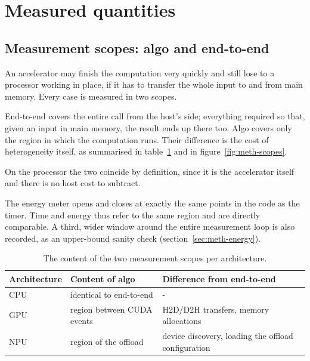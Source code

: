

\section{Measured quantities}
\label{sec:meth-quantities}

\subsection{Measurement scopes: algo and end-to-end}
\label{sec:meth-energy-scope}

An accelerator may finish the computation very quickly and still lose to a
processor working in place, if it has to transfer the whole input to and from
main memory. Every case is measured in two scopes.

End-to-end covers the entire call from the host's side; everything required so
that, given an input in main memory, the result ends up there too. Algo covers
only the region in which the computation runs. Their difference is the cost of
heterogeneity itself, as summarised in table~\ref{tab:scopes} and in
figure~\ref{fig:meth-scopes}.

On the processor the two coincide by definition, since it is the accelerator
itself and there is no host cost to subtract.

The energy meter opens and closes at exactly the same points in the code as the
timer. Time and energy thus refer to the same region and are directly
comparable. A third, wider window around the entire measurement loop is also
recorded, as an upper-bound sanity check (section~\ref{sec:meth-energy}).

\begin{table}[H]
    \centering
    \begin{tabularx}{\textwidth}{ll >{\raggedright\arraybackslash}X}
        \toprule
        Architecture & Content of algo & Difference from end-to-end \\
        \midrule
        CPU & identical to end-to-end & - \\
        GPU & region between CUDA events & H2D/D2H transfers, memory allocations \\
        NPU & region of the offload & device discovery, loading the offload configuration \\
        \bottomrule
    \end{tabularx}
    \caption{The content of the two measurement scopes per architecture.}
    \label{tab:scopes}
\end{table}

